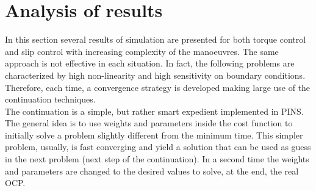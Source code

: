 \chapter{Analysis of results}
\label{Ch:Results}
In this section several results of simulation are presented for both torque control and slip control with increasing complexity of the manoeuvres. The same approach is not effective in each situation. In fact, the following problems are characterized by high non-linearity and high sensitivity on boundary conditions. Therefore, each time, a convergence strategy is developed making large use of the continuation techniques.\\
The continuation is a simple, but rather smart expedient implemented in PINS. The general idea is to use weights and parameters inside the cost function to initially solve a problem slightly different from the minimum time. This simpler problem, usually, is fast converging and yield a solution that can be used as guess in the next problem (next step of the continuation). In a second time the weights and parameters are changed to the desired values to solve, at the end, the real OCP.    
%






%